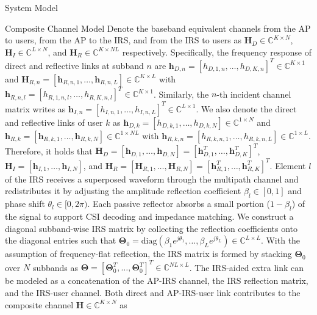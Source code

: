 \documentclass{IEEEtran}
\begin{document}
\begin{section} {System Model}
\begin{subsection}	{Composite Channel Model}
		Denote the baseband equivalent channels from the AP to users, from the AP to the IRS, and from the IRS to users as $\boldsymbol{H}_D \in \mathbb{C}^{K \times N}$, $\boldsymbol{H}_I \in \mathbb{C}^{L \times N}$, and $\boldsymbol{H}_R \in \mathbb{C}^{K \times NL}$ respectively. Specifically, the frequency response of direct and reflective links at subband $n$ are $\boldsymbol{h}_{D,n}=[h_{D,1,n},\dots,h_{D,K,n}]^T \in \mathbb{C}^{K \times 1}$ and $\boldsymbol{H}_{R,n}=[\boldsymbol{h}_{R,n,1},\dots,\boldsymbol{h}_{R,n,L}] \in \mathbb{C}^{K \times L}$ with $\boldsymbol{h}_{R,n,l}=[h_{R,1,n,l},\dots,h_{R,K,n,l}]^T \in \mathbb{C}^{K \times 1}$. Similarly, the $n$-th incident channel matrix writes as $\boldsymbol{h}_{I,n}=[h_{I,n,1},\dots,h_{I,n,L}]^T \in \mathbb{C}^{L \times 1}$. We also denote the direct and reflective links of user $k$ as $\boldsymbol{h}_{D,k}=[h_{D,k,1},\dots,h_{D,k,N}] \in \mathbb{C}^{1 \times N}$ and $\boldsymbol{h}_{R,k}=[\boldsymbol{h}_{R,k,1},\dots,\boldsymbol{h}_{R,k,N}] \in \mathbb{C}^{1 \times NL}$ with $\boldsymbol{h}_{R,k,n}=[h_{R,k,n,1},\dots,h_{R,k,n,L}] \in \mathbb{C}^{1 \times L}$. Therefore, it holds that $\boldsymbol{H}_D=[\boldsymbol{h}_{D,1},\dots,\boldsymbol{h}_{D,N}]=[\boldsymbol{h}_{D,1}^T,\dots,\boldsymbol{h}_{D,K}^T]^T$, $\boldsymbol{H}_I=[\boldsymbol{h}_{I,1},\dots,\boldsymbol{h}_{I,N}]$, and $\boldsymbol{H}_R=[\boldsymbol{H}_{R,1},\dots,\boldsymbol{H}_{R,N}]=[\boldsymbol{h}_{R,1}^T,\dots,\boldsymbol{h}_{R,K}^T]^T$.
		Element $l$ of the IRS receives a superposed waveform through the multipath channel and redistributes it by adjusting the amplitude reflection coefficient $\beta_l \in [0,1]$ and phase shift $\theta_l \in [0,2\pi)$. Each passive reflector absorbs a small portion ($1 - \beta_l$) of the signal to support CSI decoding and impedance matching. We construct a diagonal subband-wise IRS matrix by collecting the reflection coefficients onto the diagonal entries such that $\boldsymbol{\Theta}_0 = \text{diag}(\beta_1 e^{j \theta_1}, \dots, \beta_L e^{j \theta_L}) \in \mathbb{C}^{L \times L}$. With the assumption of frequency-flat reflection, the IRS matrix is formed by stacking $\boldsymbol{\Theta}_0$ over $N$ subbands as $\boldsymbol{\Theta} = [\boldsymbol{\Theta}_0^T,\dots,\boldsymbol{\Theta}_0^T]^T \in \mathbb{C}^{NL \times L}$. The IRS-aided extra link can be modeled as a concatenation of the AP-IRS channel, the IRS reflection matrix, and the IRS-user channel. Both direct and AP-IRS-user link contributes to the composite channel $\boldsymbol{H} \in \mathbb{C}^{K \times N}$ as
		\begin{equation}	\label{eq:H}

\end{equation}
\end{subsection}
\end{section}
\end{document}

